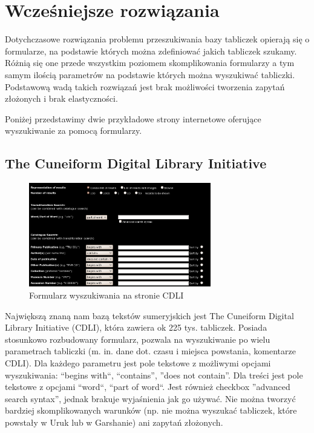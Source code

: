 \chapter{Wcześniejsze rozwiązania}\label{r:losers}

Dotychczasowe rozwiązania problemu przeszukiwania bazy tabliczek opierają się o formularze, na podstawie których można zdefiniować jakich tabliczek szukamy. Różnią się one przede wszystkim poziomem skomplikowania formularzy a tym samym ilością parametrów na podstawie których można wyszukiwać tabliczki. Podstawową wadą takich rozwiązań jest brak możliwości tworzenia zapytań złożonych i brak elastyczności.

Poniżej przedstawimy dwie przykładowe strony internetowe oferujące wyszukiwanie za pomocą formularzy.
\section{The Cuneiform Digital Library Initiative \cite{cdli}}
\begin{figure}[h]
 \centering
 \includegraphics[width=300px]{../diagramy/cdli-search.png}
 \caption{Formularz wyszukiwania na stronie CDLI}
 \label{fig:cdli-search}
\end{figure}
Największą znaną nam bazą tekstów sumeryjskich jest The Cuneiform Digital Library Initiative (CDLI), która zawiera ok 225 tys. tabliczek. Posiada stosunkowo rozbudowany formularz, pozwala na wyszukiwanie po wielu parametrach tabliczki (m. in. dane dot. czasu i miejsca powstania, komentarze CDLI). Dla każdego parametru jest pole tekstowe z możliwymi opcjami wyszukiwania: ``begins with``, ``contains'', ''does not contain''. Dla treści jest pole tekstowe z opcjami ``word``, ``part of word``. Jest również checkbox ''advanced search syntax'', jednak brakuje wyjaśnienia jak go używać.
Nie można tworzyć bardziej skomplikowanych warunków (np. nie można wyszukać tabliczek, które powstały w Uruk lub w Garshanie) ani zapytań złożonych.

